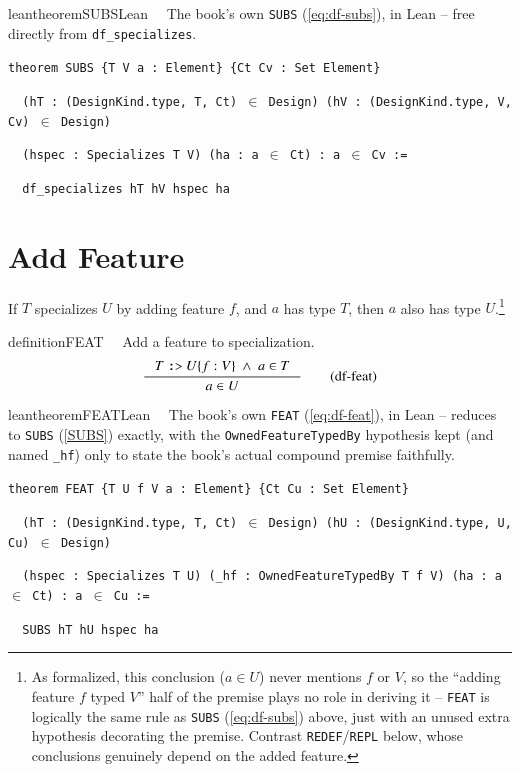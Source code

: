 \begin{restatable}{leantheorem}{SUBSLean}~~ The book's own \texttt{SUBS}
(\ref{eq:df-subs}), in Lean -- free directly from \texttt{df\_specializes}.

\texttt{\textcolor{leancolor}{theorem} \textcolor{leanyellow}{SUBS} \{T V a : Element\} \{Ct Cv : Set Element\}}

\texttt{~~(hT : (DesignKind.type, T, Ct) $\in$ Design) (hV : (DesignKind.type, V, Cv) $\in$ Design)}

\texttt{~~(hspec : Specializes T V) (ha : a $\in$ Ct) : a $\in$ Cv :=}

\texttt{~~df\_specializes hT hV hspec ha}
\label{SUBS}
\end{restatable}

\section{Add Feature}
If $T$ specializes $U$ by adding feature $f$, and $a$ has type $T$, then $a$ also has type $U$.\footnote{As
formalized, this conclusion ($a \in U$) never mentions $f$ or $V$, so the ``adding feature $f$
typed $V$'' half of the premise plays no role in deriving it -- \texttt{FEAT} is logically the same
rule as \texttt{SUBS} (\ref{eq:df-subs}) above, just with an unused extra hypothesis decorating the
premise. Contrast \texttt{REDEF}/\texttt{REPL} below, whose conclusions genuinely depend on the
added feature.}
\begin{restatable}{definition}{FEAT}~~
  Add a feature to specialization.
\begin{align}
\inference
{T~\texttt{:>}~U\{f:V\} ~\wedge~a \in T}
{a \in U}
\label{eq:df-feat}\tag{df-feat}
\end{align}
\end{restatable}

\begin{restatable}{leantheorem}{FEATLean}~~ The book's own \texttt{FEAT}
(\ref{eq:df-feat}), in Lean -- reduces to \texttt{SUBS} (\ref{SUBS}) exactly, with the
\texttt{OwnedFeatureTypedBy} hypothesis kept (and named \texttt{\_hf}) only to state the book's
actual compound premise faithfully.

\texttt{\textcolor{leancolor}{theorem} \textcolor{leanyellow}{FEAT} \{T U f V a : Element\} \{Ct Cu : Set Element\}}

\texttt{~~(hT : (DesignKind.type, T, Ct) $\in$ Design) (hU : (DesignKind.type, U, Cu) $\in$ Design)}

\texttt{~~(hspec : Specializes T U) (\_hf : OwnedFeatureTypedBy T f V) (ha : a $\in$ Ct) : a $\in$ Cu :=}

\texttt{~~SUBS hT hU hspec ha}
\label{FEAT}
\end{restatable}

